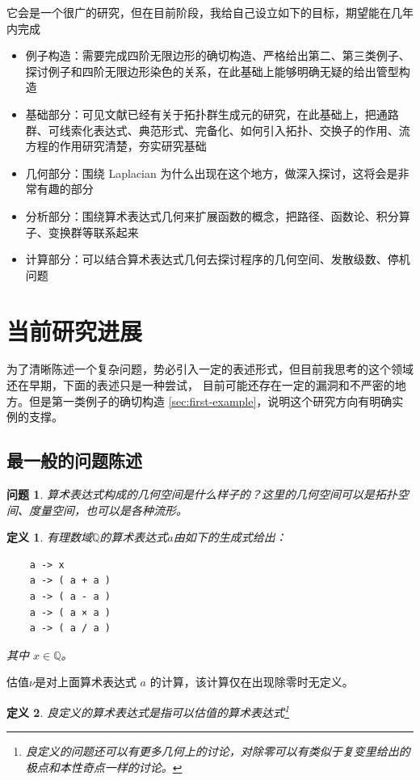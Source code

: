 \documentclass[a4paper,12pt]{article}
\newtheorem{problem}{问题}
\numberwithin{problem}{section}
\newtheorem{definition}{定义}
\numberwithin{definition}{section}
\numberwithin{lemma}{section}
\numberwithin{proposition}{section}
\numberwithin{theorem}{section}
\numberwithin{grammar}{section}
\numberwithin{program}{section}
\numberwithin{convention}{section}
\numberwithin{corollary}{section}
\begin{document}
它会是一个很广的研究，但在目前阶段，我给自己设立如下的目标，期望能在几年内完成
\begin{itemize}
    \item 例子构造：需要完成四阶无限边形的确切构造、严格给出第二、第三类例子、探讨例子和四阶无限边形染色的关系，在此基础上能够明确无疑的给出管型构造
    \item 基础部分：可见文献已经有关于拓扑群生成元的研究，在此基础上，把通路群、可线索化表达式、典范形式、完备化、如何引入拓扑、交换子的作用、流方程的作用研究清楚，夯实研究基础
    \item 几何部分：围绕 Laplacian 为什么出现在这个地方，做深入探讨，这将会是非常有趣的部分
    \item 分析部分：围绕算术表达式几何来扩展函数的概念，把路径、函数论、积分算子、变换群等联系起来
    \item 计算部分：可以结合算术表达式几何去探讨程序的几何空间、发散级数、停机问题
\end{itemize}

\newpage
\section{当前研究进展}

为了清晰陈述一个复杂问题，势必引入一定的表述形式，但目前我思考的这个领域还在早期，下面的表述只是一种尝试，
目前可能还存在一定的漏洞和不严密的地方。但是第一类例子的确切构造 \ref{sec:first-example}，说明这个研究方向有明确实例的支撑。

\subsection{最一般的问题陈述}

\begin{problem}
    算术表达式构成的几何空间是什么样子的？这里的几何空间可以是拓扑空间、度量空间，也可以是各种流形。
\end{problem}

\begin{definition}
    有理数域$\mathbb{Q}$的算术表达式$a$由如下的生成式给出：
    \begin{lstlisting}
    a -> x
    a -> ( a + a )
    a -> ( a - a )
    a -> ( a × a )
    a -> ( a / a )
    \end{lstlisting}
    其中 $x \in \mathbb{Q}$。
\end{definition}

估值$\nu$是对上面算术表达式 $a$ 的计算，该计算仅在出现除零时无定义。

\begin{definition}
    良定义的算术表达式是指可以估值的算术表达式\footnote{良定义的问题还可以有更多几何上的讨论，对除零可以有类似于复变里给出的极点和本性奇点一样的讨论。}
\end{definition}
\end{document}
